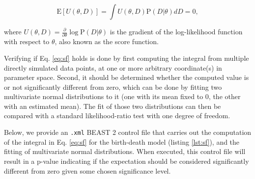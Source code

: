 \documentclass[oneside]{article}
\begin{document}
\begin{equation}\label{eq:sf}
  \text{E}[U(\theta,D)] = \int U(\theta,D)\text{P}(D|\theta)dD = 0,
\end{equation}

\noindent where $U(\theta,D)=\frac{\partial}{\partial\theta}\log
\text{P}(D|\theta)$ is the gradient of the log-likelihood function with
respect to $\theta$, also known as the score function.

Verifying if Eq. \ref{eq:sf} holds is done by first computing the
integral from multiple directly simulated data points, at one or
more arbitrary coordinate(s) in parameter space.
Second, it should be determined whether the computed value is or not
significantly different from zero, which can be done by fitting two
multivariate normal distributions to it (one with its mean fixed
to 0, the other with an estimated mean).
The fit of those two distributions can then be compared with a
standard likelihood-ratio test with one degree of freedom.

Below, we provide an \texttt{.xml} BEAST 2 control file that carries out the
computation of the integral in Eq. \ref{eq:sf} for the birth-death
model (listing \ref{lst:sf}), and the fitting of multivariate normal distributions.
When executed, this control file will result in a p-value indicating if
the expectation should be considered significantly different from zero
given some chosen significance level.
\end{document}
